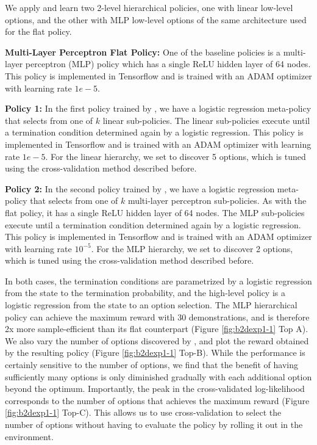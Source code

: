 We apply \alg and learn two 2-level hierarchical policies, one with linear low-level options, and the other with MLP low-level options of the same architecture used for the flat policy. 

\vspace{0.25em}\noindent \textbf{Multi-Layer Perceptron Flat Policy: } One of the baseline policies is a multi-layer perceptron (MLP) policy which has a single ReLU hidden layer of 64 nodes.
This policy is implemented in Tensorflow and is trained with an ADAM optimizer with learning rate $1e-5$.

\vspace{0.25em}\noindent \textbf{\alg Policy 1: } In the first policy trained by \alg, we have a logistic regression meta-policy that selects from one of $k$ linear sub-policies. The linear sub-policies execute until a termination condition determined again by a logistic regression. This policy is implemented in Tensorflow and is trained with an ADAM optimizer with learning rate $1e-5$. For the linear hierarchy, we set \alg to discover 5 options, which is tuned using the cross-validation method described before.

\vspace{0.25em}\noindent \textbf{\alg Policy 2: } In the second policy trained by \alg, we have a logistic regression meta-policy that selects from one of $k$ multi-layer perceptron sub-policies. 
As with the flat policy, it has a single ReLU hidden layer of 64 nodes.
The MLP sub-policies execute until a termination condition determined again by a logistic regression. This policy is implemented in Tensorflow and is trained with an ADAM optimizer with learning rate $10^{-5}$. For the MLP hierarchy, we set \alg to discover 2 options, which is tuned using the cross-validation method described before.

In both cases, the termination conditions are parametrized by a logistic regression from the state to the termination probability, and the high-level policy is a logistic regression from the state to an option selection.
The MLP hierarchical policy can achieve the maximum reward with  30 demonstrations, and is therefore 2x more sample-efficient than its flat counterpart (Figure \ref{fig:b2dexp1-1} Top A).
We also vary the number of options discovered by \alg, and plot the reward obtained by the resulting policy (Figure \ref{fig:b2dexp1-1} Top-B). While the performance is certainly sensitive to the number of options, we find that the benefit of having sufficiently many options is only diminished gradually with each additional option beyond the optimum. Importantly, the peak in the cross-validated log-likelihood corresponds to the number of options that achieves the maximum reward (Figure \ref{fig:b2dexp1-1} Top-C). This allows us to use cross-validation to select the number of options without having to evaluate the policy by rolling it out in the environment.

